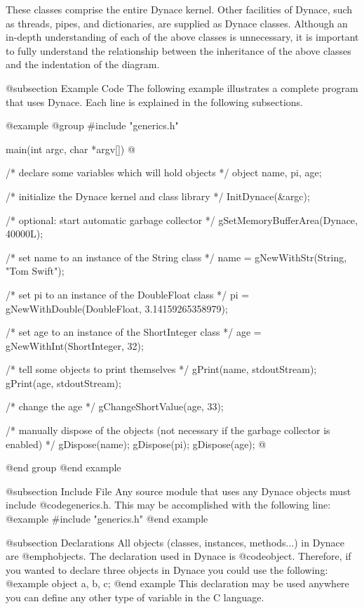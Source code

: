 These classes comprise the entire Dynace kernel.  Other facilities of Dynace,
such as threads, pipes, and dictionaries, are supplied as Dynace classes.
Although an in-depth understanding of each of the above classes is
unnecessary, it is important to fully understand the relationship between
the inheritance of the above classes and the indentation of the diagram.

@subsection Example Code
The following example illustrates a complete program that uses Dynace.
Each line is explained in the following subsections.

@example
@group
#include "generics.h"

main(int argc, char *argv[])
@{
        /*  declare some variables which will hold objects  */
        object  name, pi, age;

        /*  initialize the Dynace kernel and class library  */
        InitDynace(&argc);

        /*  optional:  start automatic garbage collector  */
        gSetMemoryBufferArea(Dynace, 40000L);


        /*  set name to an instance of the String class  */
        name = gNewWithStr(String, "Tom Swift");

        /*  set pi to an instance of the DoubleFloat class  */
        pi   = gNewWithDouble(DoubleFloat, 3.14159265358979);

        /*  set age to an instance of the ShortInteger class  */
        age  = gNewWithInt(ShortInteger, 32);

        /*  tell some objects to print themselves  */
        gPrint(name, stdoutStream);
        gPrint(age, stdoutStream);

        /*  change the age  */
        gChangeShortValue(age, 33);
        


        /*  manually dispose of the objects (not necessary if the
            garbage collector is enabled)  */
        gDispose(name);
        gDispose(pi);
        gDispose(age);
@}
@end group
@end example

@subsection Include File
Any source module that uses any Dynace objects must include @code{generics.h}.
This may be accomplished with the following line:
@example
#include "generics.h"
@end example

@subsection Declarations
All objects (classes, instances, methods...) in Dynace are @emph{objects}.
The declaration used in Dynace is @code{object}.  Therefore, if you wanted
to declare three objects in Dynace you could use the following:
@example
        object   a, b, c;
@end example
This declaration may be used anywhere you can define any other type of
variable in the C language.

